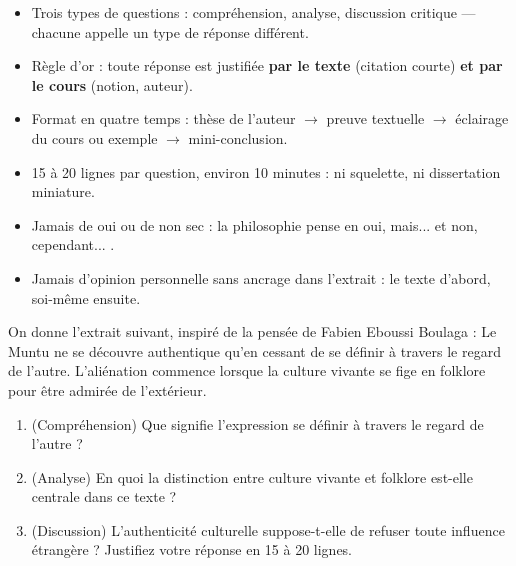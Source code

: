 \documentclass[11pt]{article}
\newcommand{\cle}[1]{{\popxbold\color{popdark}#1}}
\begin{document}
\begin{aretenir}
\begin{itemize}
\item Trois types de questions : \cle{compréhension}, \cle{analyse}, \cle{discussion critique} — chacune appelle un type de réponse différent.
\item Règle d'or : toute réponse est justifiée \textbf{par le texte} (citation courte) \textbf{et par le cours} (notion, auteur).
\item Format en quatre temps : thèse de l'auteur $\rightarrow$ preuve textuelle $\rightarrow$ éclairage du cours ou exemple $\rightarrow$ mini-conclusion.
\item 15 à 20 lignes par question, environ 10 minutes : ni squelette, ni dissertation miniature.
\item Jamais de \og oui \fg{} ou de \og non \fg{} sec : la philosophie pense en \og oui, mais... \fg{} et \og non, cependant... \fg{}.
\item Jamais d'opinion personnelle sans ancrage dans l'extrait : le texte d'abord, soi-même ensuite.
\end{itemize}
\end{aretenir}

\begin{exercice}
On donne l'extrait suivant, inspiré de la pensée de Fabien Eboussi Boulaga : \og Le Muntu ne se découvre authentique qu'en cessant de se définir à travers le regard de l'autre. L'aliénation commence lorsque la culture vivante se fige en folklore pour être admirée de l'extérieur. \fg{}
\begin{enumerate}
\item (Compréhension) Que signifie l'expression \og se définir à travers le regard de l'autre \fg{} ?
\item (Analyse) En quoi la distinction entre \og culture vivante \fg{} et \og folklore \fg{} est-elle centrale dans ce texte ?
\item (Discussion) L'authenticité culturelle suppose-t-elle de refuser toute influence étrangère ? Justifiez votre réponse en 15 à 20 lignes.
\end{enumerate}
\end{exercice}
\end{document}
